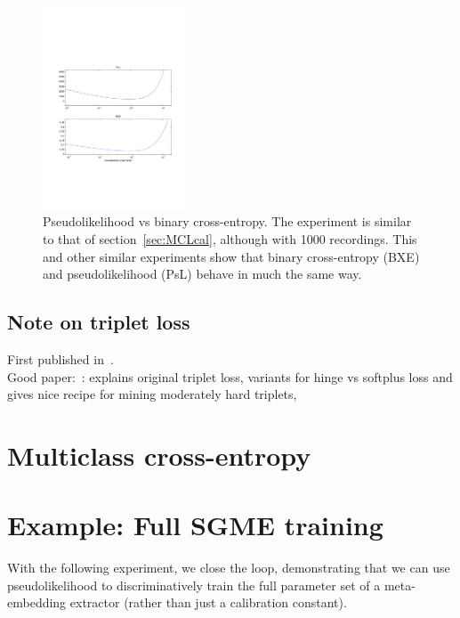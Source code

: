 \documentclass[a4paper,oneside,12pt,english]{report}
\begin{document}
\begin{figure}[htb!]
\centering
\includegraphics[height=6cm,trim={0cm 7cm 0cm 8cm},clip]{SGME_cal_PsL_vs_BXE_1000rec.pdf}        %
\caption[Pseudolikelihood vs binary cross-entropy]{Pseudolikelihood vs binary cross-entropy. The experiment is similar to that of section~\ref{sec:MCLcal}, although with 1000 recordings. This and other similar experiments show that binary cross-entropy (BXE) and pseudolikelihood (PsL) behave in much the same way.}
\label{fig:BXE_vs_PsL}
\end{figure}


\subsection{Note on triplet loss}
First published in~\cite{Facenet}.\\

\noindent Good paper:~\cite{Defense_Triplet}: explains original triplet loss, variants for hinge vs softplus loss and gives nice recipe for mining moderately hard triplets,

 

\section{Multiclass cross-entropy}
\cite{DSIS17,LIMSI_Language_embedding}



\section{Example: Full SGME training}
\def\Pmat{\mathbf{P}}
With the following experiment, we close the loop, demonstrating that we can use pseudolikelihood to discriminatively train the full parameter set of a meta-embedding extractor (rather than just a calibration constant). 
\end{document}
